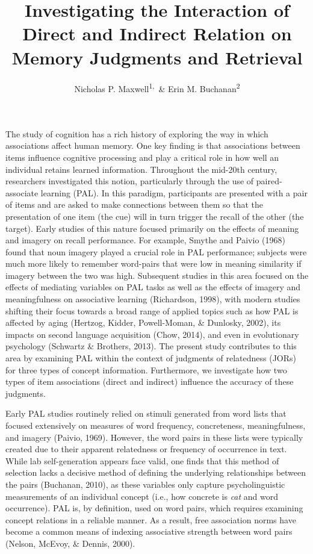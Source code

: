 \documentclass[english,,man]{apa6}
\title{Investigating the Interaction of Direct and Indirect Relation on Memory Judgments and Retrieval}
\author{Nicholas P. Maxwell\textsuperscript{1,}~\& Erin M. Buchanan\textsuperscript{2}}
\date{}
\affiliation{
\vspace{0.5cm}
\textsuperscript{1} University of Southern Mississippi\\\textsuperscript{2} Harrisburg University of Science and Technology}
\begin{document}
\maketitle

The study of cognition has a rich history of exploring the way in which associations affect human memory. One key finding is that associations between items influence cognitive processing and play a critical role in how well an individual retains learned information. Throughout the mid-20th century, researchers investigated this notion, particularly through the use of paired-associate learning (PAL). In this paradigm, participants are presented with a pair of items and are asked to make connections between them so that the presentation of one item (the cue) will in turn trigger the recall of the other (the target). Early studies of this nature focused primarily on the effects of meaning and imagery on recall performance. For example, Smythe and Paivio (1968) found that noun imagery played a crucial role in PAL performance; subjects were much more likely to remember word-pairs that were low in meaning similarity if imagery between the two was high. Subsequent studies in this area focused on the effects of mediating variables on PAL tasks as well as the effects of imagery and meaningfulness on associative learning (Richardson, 1998), with modern studies shifting their focus towards a broad range of applied topics such as how PAL is affected by aging (Hertzog, Kidder, Powell-Moman, \& Dunlosky, 2002), its impacts on second language acquisition (Chow, 2014), and even in evolutionary psychology (Schwartz \& Brothers, 2013). The present study contributes to this area by examining PAL within the context of judgments of relatedness (JORs) for three types of concept information. Furthermore, we investigate how two types of item associations (direct and indirect) influence the accuracy of these judgments.

Early PAL studies routinely relied on stimuli generated from word lists that focused extensively on measures of word frequency, concreteness, meaningfulness, and imagery (Paivio, 1969). However, the word pairs in these lists were typically created due to their apparent relatedness or frequency of occurrence in text. While lab self-generation appears face valid, one finds that this method of selection lacks a decisive method of defining the underlying relationships between the pairs (Buchanan, 2010), as these variables only capture psycholinguistic measurements of an individual concept (i.e., how concrete is \emph{cat} and word occurrence). PAL is, by definition, used on word pairs, which requires examining concept relations in a reliable manner. As a result, free association norms have become a common means of indexing associative strength between word pairs (Nelson, McEvoy, \& Dennis, 2000).
\end{document}
